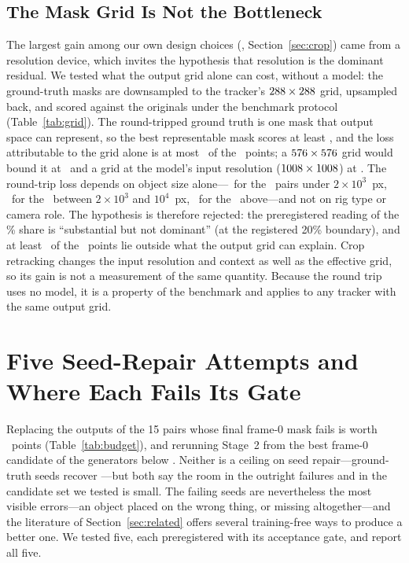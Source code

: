 \documentclass[journal]{IEEEtran}
\newcommand{\px}{~px}
\begin{document}
\subsection{The Mask Grid Is Not the Bottleneck}
\label{sec:grid}
The largest gain among our own design choices (\gainCrop,
Section~\ref{sec:crop}) came from a resolution device, which invites the
hypothesis that resolution is the dominant residual. We tested what the output grid alone can
cost, without a model: the ground-truth masks are downsampled to the tracker's
$288\times288$ grid, upsampled back, and scored against the originals
under the benchmark protocol (Table~\ref{tab:grid}). The round-tripped ground
truth is one mask that output space can represent, so the best representable
mask scores at least \ceilNow, and the loss attributable to the grid alone is at
most \lossNow\ of the \totalGap\ points; a $576\times576$ grid would
bound it at \lossMid\ and a grid at the model's input resolution
($1008\times1008$) at \lossHigh. The round-trip loss depends
on object size alone---\ceilSmall\ for the \nSmallRows\ pairs under
$2\times10^{3}$\px, \ceilMedium\ for the \nMediumRows\ between
$2\times10^{3}$ and $10^{4}$\px, \ceilLarge\ for the \nLargeRows\ above---and
not on rig type or camera role. The hypothesis is therefore rejected: the
preregistered reading of the \shareNow\% share is ``substantial but not
dominant'' (at the registered 20\% boundary), and at least \gapNotGrid\ of the
\totalGap\ points lie outside what the output grid can explain. Crop retracking
changes the input resolution and context as well as the effective grid, so its
gain is not a measurement of the same quantity. Because the round trip uses no
model, it is a property of the benchmark and applies to any tracker with the
same output grid.

\section{Five Seed-Repair Attempts and Where Each Fails Its Gate}
\label{sec:negative}

Replacing the outputs of the 15 pairs whose final frame-0 mask fails is worth
\oracleSeed\ points (Table~\ref{tab:budget}), and rerunning Stage~2 from the
best frame-0 candidate of the generators below \oracleReal. Neither is a
ceiling on seed repair---ground-truth seeds recover \gtSeedHeadlineDelta---but
both say the room in the outright failures and in the candidate set we tested
is small. The failing seeds are nevertheless the
most visible errors---an object placed on the wrong thing, or missing
altogether---and the literature of
Section~\ref{sec:related} offers several training-free ways to produce a better
one. We tested five, each preregistered with its acceptance gate, and report
all five.
\end{document}
